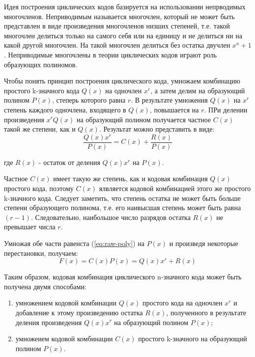 \documentclass[russian,utf8,simple,emptystyle]{eskdtext}
\begin{document}
Идея построения циклических кодов базируется на использовании непрводимых многочленов. Неприводимым называется многочлен, который не может быть представлен в виде произведения многочленов низших степеней, т.е. такой многочлен делиться только на самого себя или на единицу и не делиться ни на какой другой многочлен. На такой многочлен делиться без остатка двучлен $x^n+1$. Неприводимые многочлены в теории циклических кодов играют роль образующих полиномов.

Чтобы понять принцип построения циклического кода, умножаем комбинацию простого k-значного кода $Q(x)$ на одночлен $x^r$, а затем делим на образующий полином $P(x)$, степерь которого равна $r$. В результате умножения $Q(x)$ на $x^r$ степень каждого одночлена, входящего в $Q(x)$, повышается на $r$. ПРи делении произведения $x^rQ(x)$ на образующий полином получается частное $C(x)$ такой же степени, как и $Q(x)$. Результат можно представить в виде:
\begin{equation} \label{eq:raw-poly}
\frac{Q(x)x^r}{P(x)} = C(x) + \frac{R(x)}{P(x)}
\end{equation}
\begin{ESKDexplanation}
\item[где] $R(x)$ - остаток от деления $Q(x)x^r$ на $P(x)$.
\end{ESKDexplanation}

Частное $C(x)$ имеет такую же степень, как и кодовая комбинация $Q(x)$ простого кода, поэтому $C(x)$ ялвляется кодовой комбинацией этого же простого k-значного кода. Следует заметить, что степень остатка не может быть больше степени образующего полинома, т.е. его наивысшая степень может быть равна $(r-1)$. Следовательно, наибольшое число разрядов остатка $R(x)$ не превышает числа $r$.

Умножая обе части равенста (\ref{eq:raw-poly}) на $P(x)$ и произведя некоторые перестановки, получаем:
\begin{equation} \label{eq:made-poly}
F(x) = C(x)P(x) = Q(x)x^r + R(x)
\end{equation}

Таким образом, кодовая комбинация циклического n-значного кода может быть получена двумя способами:
\begin{enumerate}
\item умножением кодовой комбинации $Q(x)$ простого кода на одночлен $x^r$ и добавление к этому произведению остатка $R(x)$, полученного в результате деления произведения $Q(x)x^r$ на образующий полином $P(x)$;
\item умножеием кодовой комбинации $C(x)$ простого k-значного на образующий полином $P(x)$.
\end{enumerate}
\end{document}
